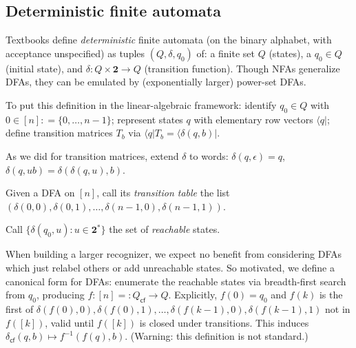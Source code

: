 \subsection{Deterministic finite automata}
\label{far-defs-dfa}
Textbooks define \emph{deterministic} finite automata (on the binary alphabet, with acceptance unspecified) as tuples $(Q, \delta, q_0)$ of: a finite set $Q$ (states), a $q_0\in Q$ (initial state), and $\delta: Q\times\mathbf{2}\to Q$ (transition function).
Though NFAs generalize DFAs, they can be emulated by (exponentially larger) power-set DFAs.

To put this definition in the linear-algebraic framework:
identify $q_0\in Q$ with $0\in [n]\mathrel{\mathop:}=\{0,\ldots,n-1\}$;
represent states $q$ with elementary row vectors $\langle q\vert$;
define transition matrices $T_b$ via $\langle q\vert T_b = \langle \delta(q, b)\vert$.

As we did for transition matrices, extend $\delta$ to words: $\delta(q,\epsilon)=q$, $\delta(q,ub)=\delta(\delta(q,u),b)$.

Given a DFA on $[n]$, call its \emph{transition table} the list $(\delta(0,0),\delta(0,1),\ldots,\delta(n-1,0),\delta(n-1,1))$.

Call $\{\delta(q_0,u): u\in\mathbf{2}^*\}$ the set of \emph{reachable} states.

When building a larger recognizer,
we expect no benefit from considering DFAs which just relabel others or add unreachable states.
So motivated, we define a canonical form for DFAs:
enumerate the reachable states via breadth-first search from $q_0$,
producing $f:[n]=\mathrel{\mathop:}Q_\textsf{cf}\to Q$.
Explicitly,
 $f(0)=q_0$ and $f(k)$ is the first of
 $\delta(f(0),0), \delta(f(0),1), \ldots, \delta(f(k-1),0), \delta(f(k-1),1)$ not in $f([k])$,
 valid until $f([k])$ is closed under transitions.
This induces $\delta_\textsf{cf}(q,b)\mapsto f^{-1}(f(q), b)$.
(Warning: this definition is not standard.)

